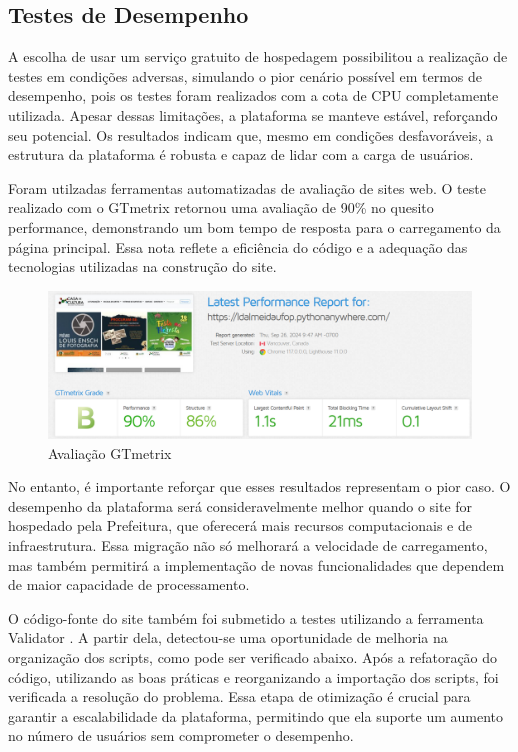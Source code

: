 \subsection{Testes de Desempenho}

A escolha de usar um serviço gratuito de hospedagem possibilitou a realização de testes em condições adversas, simulando o pior cenário possível em termos de desempenho, pois os testes foram realizados com a cota de CPU completamente utilizada. Apesar dessas limitações, a plataforma se manteve estável, reforçando seu potencial. Os resultados indicam que, mesmo em condições desfavoráveis, a estrutura da plataforma é robusta e capaz de lidar com a carga de usuários.

Foram utilzadas ferramentas automatizadas de avaliação de sites web. O teste realizado com o GTmetrix \cite{GTMetrix} retornou uma avaliação de 90\% no quesito performance, demonstrando um bom tempo de resposta para o carregamento da página principal. Essa nota reflete a eficiência do código e a adequação das tecnologias utilizadas na construção do site.

\begin{figure}[htb] \caption{\label{fig_grafico}Avaliação GTmetrix} \begin{center} \includegraphics[scale=0.3]{./img/gtmetrix.png} \end{center}  \end{figure}

No entanto, é importante reforçar que esses resultados representam o pior caso. O desempenho da plataforma será consideravelmente melhor quando o site for hospedado pela Prefeitura, que oferecerá mais recursos computacionais e de infraestrutura. Essa migração não só melhorará a velocidade de carregamento, mas também permitirá a implementação de novas funcionalidades que dependem de maior capacidade de processamento.

O código-fonte do site também foi submetido a testes utilizando a ferramenta Validator \cite{Validator}. A partir dela, detectou-se uma oportunidade de melhoria na organização dos scripts, como pode ser verificado abaixo. Após a refatoração do código, utilizando as boas práticas e reorganizando a importação dos scripts, foi verificada a resolução do problema. Essa etapa de otimização é crucial para garantir a escalabilidade da plataforma, permitindo que ela suporte um aumento no número de usuários sem comprometer o desempenho.

